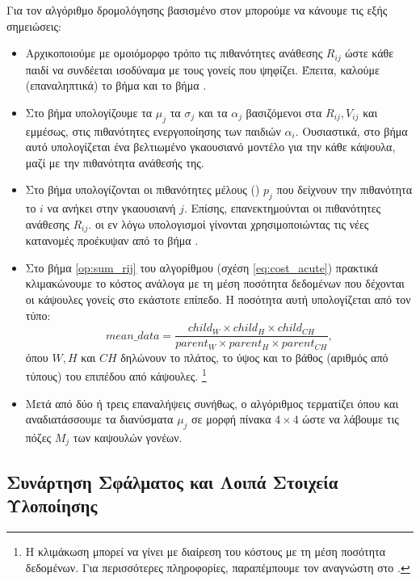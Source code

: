 Για τον αλγόριθμο δρομολόγησης βασισμένο στον  μπορούμε να κάνουμε τις εξής σημειώσεις:
\begin{itemize}
  \item Αρχικοποιούμε με ομοιόμορφο τρόπο τις πιθανότητες ανάθεσης $R_{ij}$ ώστε κάθε παιδί να συνδέεται ισοδύναμα με τους γονείς που ψηφίζει. Έπειτα, καλούμε (επαναληπτικά) το βήμα  και το βήμα .
  \item Στο βήμα  υπολογίζουμε τα $\mu_j$ τα $\sigma_j$ και τα $\alpha_j$ βασιζόμενοι στα $R_{ij}, V_{ij}$ και εμμέσως, στις πιθανότητες ενεργοποίησης των παιδιών $\alpha_i$. Ουσιαστικά, στο βήμα αυτό υπολογίζεται ένα βελτιωμένο γκαουσιανό μοντέλο για την κάθε κάψουλα, μαζί με την πιθανότητα ανάθεσής της. 
  \item Στο βήμα  υπολογίζονται οι πιθανότητες μέλους () $p_j$ που δείχνουν την πιθανότητα το  $i$ να ανήκει στην γκαουσιανή $j$. Επίσης, επανεκτημούνται οι πιθανότητες ανάθεσης $R_{ij}$. οι εν λόγω υπολογισμοί γίνονται χρησιμοποιώντας τις νέες κατανομές προέκυψαν από το βήμα .
  \item Στο βήμα \ref{op:sum_rij} του αλγορίθμου (σχέση \ref{eq:cost_acute}) πρακτικά κλιμακώνουμε το κόστος ανάλογα με τη μέση ποσότητα δεδομένων που δέχονται οι κάψουλες γονείς στο εκάστοτε επίπεδο. Η ποσότητα αυτή υπολογίζεται από τον τύπο:
  \begin{equation}
    mean\_data = \frac{child_W \times child_H \times child_{CH}}{parent_W \times parent_H \times parent_{CH}},
  \end{equation}
  όπου $W, H$ και $CH$ δηλώνουν το πλάτος, το ύψος και το βάθος (αριθμός από τύπους) του επιπέδου από κάψουλες. \footnote{Η κλιμάκωση μπορεί να γίνει με διαίρεση του κόστους με τη μέση ποσότητα δεδομένων. Για περισσότερες πληροφορίες, παραπέμπουμε τον αναγνώστη στο \cite{gritzman2019avoiding}.}
  \item Μετά από δύο ή τρεις επαναλήψεις συνήθως, ο αλγόριθμος τερματίζει όπου και αναδιατάσσουμε τα διανύσματα $\mu_j$ σε μορφή πίνακα $4 \times 4$ ώστε να λάβουμε τις πόζες $M_j$ των καψουλών γονέων.
\end{itemize}

\subsection{Συνάρτηση Σφάλματος και Λοιπά Στοιχεία Υλοποίησης}

